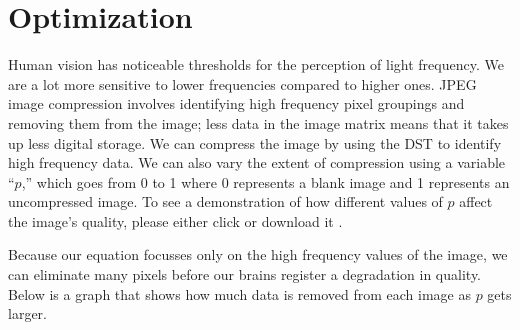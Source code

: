 \section{Optimization}

Human vision has noticeable thresholds for the perception of light frequency. We are a lot more sensitive to lower frequencies compared to higher ones. JPEG image compression involves identifying high frequency pixel groupings and removing them from the image; less data in the image matrix means that it takes up less digital storage.  We can compress the image by using the DST to identify high frequency data. We can also vary the extent of compression using a variable “$p$,” which goes from 0 to 1 where 0 represents a blank image and 1 represents an uncompressed image. To see a demonstration of how different values of $p$ affect the image's quality, please either click  or download it .

Because our equation focusses only on the high frequency values of the image, we can eliminate many pixels before our brains register a degradation in quality. Below is a graph that shows how much data is removed from each image as $p$ gets larger.


